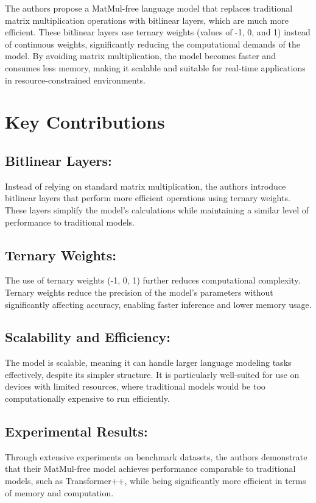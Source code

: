 \documentclass{report}
\begin{document}
	
	The authors propose a MatMul-free language model that replaces traditional matrix multiplication operations with bitlinear layers, which are much more efficient. These bitlinear layers use ternary weights (values of -1, 0, and 1) instead of continuous weights, significantly reducing the computational demands of the model. By avoiding matrix multiplication, the model becomes faster and consumes less memory, making it scalable and suitable for real-time applications in resource-constrained environments.
	
	\section{Key Contributions}
	\subsection{Bitlinear Layers:}
	Instead of relying on standard matrix multiplication, the authors introduce bitlinear layers that perform more efficient operations using ternary weights. These layers simplify the model’s calculations while maintaining a similar level of performance to traditional models.
	
	\subsection{Ternary Weights:}
	The use of ternary weights (-1, 0, 1) further reduces computational complexity. Ternary weights reduce the precision of the model's parameters without significantly affecting accuracy, enabling faster inference and lower memory usage.
	
	\subsection{Scalability and Efficiency:}
	The model is scalable, meaning it can handle larger language modeling tasks effectively, despite its simpler structure. It is particularly well-suited for use on devices with limited resources, where traditional models would be too computationally expensive to run efficiently.
	
	\subsection{Experimental Results:}
	Through extensive experiments on benchmark datasets, the authors demonstrate that their MatMul-free model achieves performance comparable to traditional models, such as Transformer++, while being significantly more efficient in terms of memory and computation.
	
\end{document}
